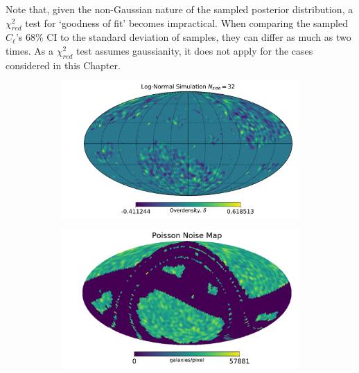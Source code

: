 \qquad Note that, given the non-Gaussian nature of the sampled posterior distribution, a $\chi^2_{red}$ test for `goodness of fit' becomes impractical. When comparing the sampled $C_{\ell}$'s 68\% CI to the standard deviation of samples, they can differ as much as two times. As a $\chi^2_{red}$ test assumes gaussianity, it does not apply for the cases considered in this Chapter.

\begin{figure}
\begin{subfigure}[b]{.5\textwidth}
 \includegraphics[scale=0.34]{BPL-FIGS/Euclid-LN-PNoi-N32-HDens_map.pdf}
  \caption{}
  \label{fig:BPL:LN-HighSN-dens}
\end{subfigure}
\begin{subfigure}[b]{.5\textwidth}
 \includegraphics[scale=0.34]{BPL-FIGS/Euclid-LN-PNoi-N32-NoiseMap.pdf}
  \caption{}
  \label{fig:BPL:LN-HighSN-noise}
\end{subfigure}\\
\begin{subfigure}{.5\textwidth}
  \centering

\end{subfigure}
\end{figure}

